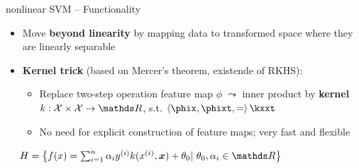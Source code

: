 \begin{frame}{nonlinear SVM -- Functionality}

\footnotesize

  

\medskip

\begin{itemize}
  \item Move \textbf{beyond linearity} by mapping data to 
  transformed space where they are linearly separable
  \item \textbf{Kernel trick} (based on Mercer's theorem, existende of RKHS): 
  \begin{itemize}
    \item Replace two-step operation feature map $\phi$ $\leadsto$ inner product 
    by \textbf{kernel} $k: \Xspace \times \Xspace \rightarrow \R$, s.t.
    $\scp{\phix, \phixt} = \kxxt$
    \item No need for explicit construction of feature maps; very fast and 
    flexible
  \end{itemize}
\end{itemize}

\medskip


 ~~
$\Hspace = \left \{ \fx = \sumin \alpha_i \yi k(\xi, \xv)  + \theta_0 |\ 
\theta_0, \alpha_i \in \R \right \} $


\end{frame}
